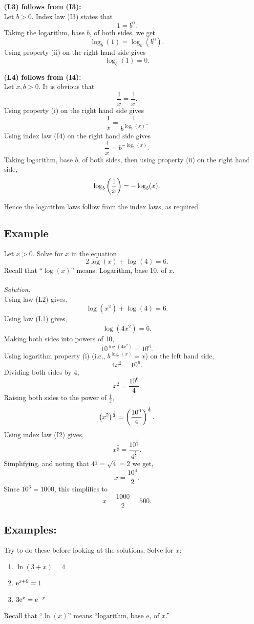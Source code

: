 \noindent \textbf{(L3) follows from (I3):} \\
Let $b > 0$. Index law (I3) states that
\[
1 = b^0.
\]
Taking the logarithm, base $b$, of both sides, we get
\[
\log_b(1) = \log_b(b^0).
\]
Using property (ii) on the right hand side gives
\[
\log_b(1) = 0.
\]
\bigskip

\noindent \textbf{(L4) follows from (I4):} \\
Let $x,b > 0$. It is obvious that
\[
\frac{1}{x} = \frac{1}{x}.
\]
Using property (i) on the right hand side gives
\[
\frac{1}{x} = \frac{1}{b^{\log_b(x)}}.
\]
Using index law (I4) on the right hand side gives
\[
\frac{1}{x} = b^{-\log_b(x)}.
\]
Taking logarithm, base $b$, of both sides, then using property (ii) on the right hand side,
\[
\log_b\left(\frac{1}{x}\right) = -\log_b(x).
\]
\bigskip

\noindent Hence the logarithm laws follow from the index laws, as required.

\subsection{Example}
Let $x > 0$. Solve for $x$ in the equation
\[
2\log(x) + \log(4) = 6.
\]
Recall that ``$\log(x)$'' means: Logarithm, base 10, of $x$. \\ \\



\noindent \textit{Solution:} \\

\noindent Using law (L2) gives,
\[
\log(x^2) + \log(4) = 6.
\]
Using law (L1) gives,
\[
\log(4x^2) = 6.
\]
Making both sides into powers of 10,
\[
10^{\log(4x^2)} = 10^6.
\]
Using logarithm property (i) (i.e., $b^{\log_b(x)} = x$) on the left hand side,
\[
4x^2 = 10^6.
\]
Dividing both sides by $4$,
\[
x^2 = \frac{10^6}{4}.
\]
Raising both sides to the power of $\frac{1}{2}$,
\[
\left(x^2\right)^\frac{1}{2} = \left(\frac{10^6}{4}\right)^\frac{1}{2}.
\]
Using index law (I2) gives,
\[
x^\frac{2}{2} = \frac{10^\frac{6}{2}}{4^\frac{1}{2}}.
\]
Simplifying, and noting that $4^\frac{1}{2} = \sqrt{4} = 2$ we get,
\[
x = \frac{10^3}{2}.
\]
Since $10^3 = 1000$, this simplifies to
\[
x = \frac{1000}{2} = 500.
\]

\subsection{Examples:}
Try to do these before looking at the solutions. Solve for $x$:
\begin{enumerate}
\item $\ln(3 + x) = 4$
\item $\mathrm{e}^{x + 9} = 1$
\item $3\mathrm{e}^x = \mathrm{e}^{-x}$ 
\end{enumerate}
Recall that ``$\ln(x)$'' means ``logarithm, base $\mathrm{e}$, of $x$.''
\bigskip

